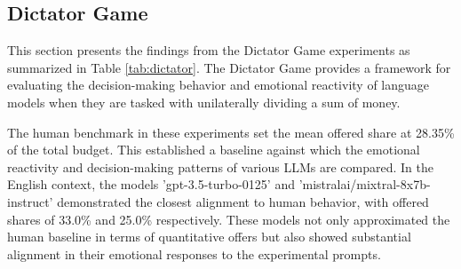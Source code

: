 \documentclass{article}
\begin{document}

\subsection{Dictator Game}

This section presents the findings from the Dictator Game experiments as summarized in Table \ref{tab:dictator}. The Dictator Game provides a framework for evaluating the decision-making behavior and emotional reactivity of language models when they are tasked with unilaterally dividing a sum of money.

The human benchmark in these experiments set the mean offered share at 28.35\% of the total budget. This established a baseline against which the emotional reactivity and decision-making patterns of various LLMs are compared. In the English context, the models 'gpt-3.5-turbo-0125' and 'mistralai/mixtral-8x7b-instruct' demonstrated the closest alignment to human behavior, with offered shares of 33.0\% and 25.0\% respectively. These models not only approximated the human baseline in terms of quantitative offers but also showed substantial alignment in their emotional responses to the experimental prompts.
\end{document}
